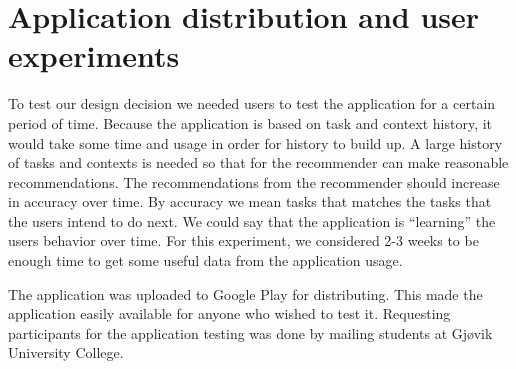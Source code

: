 \section{Application distribution and user experiments}
To test our design decision we needed users to test the application for a certain period of time. Because the application is based on task and context history, it would take some time and usage in order for history to build up. A large history of tasks and contexts is needed so that for the recommender can make reasonable recommendations. The recommendations from the recommender should increase in accuracy over time. By accuracy we mean tasks that matches the tasks that the users intend to do next. We could say that the application is ``learning'' the users behavior over time. For this experiment, we considered 2-3 weeks to be enough time to get some useful data from the application usage.

The application was uploaded to Google Play for distributing. This made the application easily available for anyone who wished to test it. Requesting participants for the application testing was done by mailing students at Gjøvik University College.